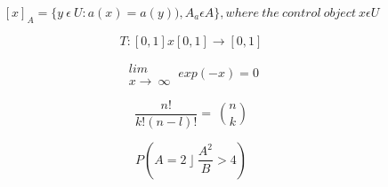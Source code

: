 \documentclass [18pt, a4paper] {article}
\begin{document}
\begin{center}
$$ [x]_A=\{y \ \epsilon \ U : a(x) = a(y)),A_a \epsilon A\}, where \ the \ control \ object \ x \epsilon U $$
\end{center} 
\begin{center}
$$ T : [0,1] x [0,1] \rightarrow [0,1] $$
\end{center}
\begin{center}
$$ \begin{array}{c}lim \\x\rightarrow\ \infty \end{array} \ exp(-x)=0 $$
\end{center}
\begin{center}
$$ \frac {n!} {k!(n-l)!} = \ {n \choose k}$$
\end{center}
\begin{center}
$$ P (A=2\ \rfloor \ \frac {A^2} {B} > 4) $$
\end{center}
\end{document}
